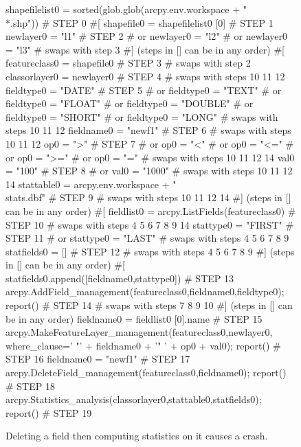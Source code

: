 \begin{figure}
{\scriptsize 
\begin{code}
shapefilelist0 = sorted(glob.glob(arcpy.env.workspace + "\\*.shp"))                   \# STEP 0
\#[
shapefile0 = shapefilelist0 [0]                                                      \# STEP 1
newlayer0 = "l1"                                                                     \# STEP 2
\#  or newlayer0 = "l2" 
\#  or newlayer0 = "l3" 
\#  swaps with step 3
\#] (steps in [] can be in any order)
\#[
featureclass0 = shapefile0                                                           \# STEP 3
\#  swaps with step 2
classorlayer0 = newlayer0                                                            \# STEP 4
\#  swaps with steps 10 11 12
fieldtype0 = "DATE"                                                                  \# STEP 5
\#  or fieldtype0 = "TEXT" 
\#  or fieldtype0 = "FLOAT" 
\#  or fieldtype0 = "DOUBLE" 
\#  or fieldtype0 = "SHORT" 
\#  or fieldtype0 = "LONG" 
\#  swaps with steps 10 11 12
fieldname0 = "newf1"                                                                 \# STEP 6
\#  swaps with steps 10 11 12
op0 = ">"                                                                            \# STEP 7
\#  or op0 = "<" 
\#  or op0 = "<=" 
\#  or op0 = ">=" 
\#  or op0 = "=" 
\#  swaps with steps 10 11 12 14
val0 = "100"                                                                         \# STEP 8
\#  or val0 = "1000" 
\#  swaps with steps 10 11 12 14
stattable0 = arcpy.env.workspace + "\\stats.dbf"                                      \# STEP 9
\#  swaps with steps 10 11 12 14
\#] (steps in [] can be in any order)
\#[
fieldlist0 = arcpy.ListFields(featureclass0)                                         \# STEP 10
\#  swaps with steps 4 5 6 7 8 9 14
stattype0 = "FIRST"                                                                  \# STEP 11
\#  or stattype0 = "LAST" 
\#  swaps with steps 4 5 6 7 8 9
statfields0 = []                                                                     \# STEP 12
\#  swaps with steps 4 5 6 7 8 9
\#] (steps in [] can be in any order)
\#[
statfields0.append([fieldname0,stattype0])                                           \# STEP 13
arcpy.AddField\_management(featureclass0,fieldname0,fieldtype0); report()             \# STEP 14
\#  swaps with steps 7 8 9 10
\#] (steps in [] can be in any order)
fieldname0 = fieldlist0 [0].name \# STEP 15
arcpy.MakeFeatureLayer\_management(featureclass0,newlayer0,
   where\_clause=' "' + fieldname0 + '" ' + op0 + val0); report()                     \# STEP 16
fieldname0 = "newf1"                                                                 \# STEP 17
arcpy.DeleteField\_management(featureclass0,fieldname0); report()                     \# STEP 18
arcpy.Statistics\_analysis(classorlayer0,stattable0,statfields0); report()            \# STEP 19
\end{code}
}
\caption{Deleting a field then computing statistics on it causes a crash.}
\label{fault2}
\end{figure}

